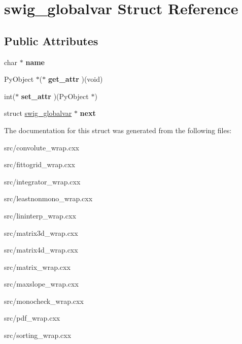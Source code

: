 \hypertarget{structswig__globalvar}{
\section{swig\_\-globalvar Struct Reference}
\label{d4/ddc/structswig__globalvar}
}
\subsection*{Public Attributes}
\begin{DoxyCompactItemize}
\item 
\hypertarget{structswig__globalvar_afbf8fc90fadf3be87612f68d2af889f7}{
char $\ast$ {\bfseries name}}
\label{d4/ddc/structswig__globalvar_afbf8fc90fadf3be87612f68d2af889f7}

\item 
\hypertarget{structswig__globalvar_a493a5974e1e2509ba48001f1a53d26ae}{
PyObject $\ast$($\ast$ {\bfseries get\_\-attr} )(void)}
\label{d4/ddc/structswig__globalvar_a493a5974e1e2509ba48001f1a53d26ae}

\item 
\hypertarget{structswig__globalvar_a494e3d5a5f1fb694b7738fdd1ffdd657}{
int($\ast$ {\bfseries set\_\-attr} )(PyObject $\ast$)}
\label{d4/ddc/structswig__globalvar_a494e3d5a5f1fb694b7738fdd1ffdd657}

\item 
\hypertarget{structswig__globalvar_a9b2b63ce956d35d5270e6460e3a1601e}{
struct \hyperlink{structswig__globalvar}{swig\_\-globalvar} $\ast$ {\bfseries next}}
\label{d4/ddc/structswig__globalvar_a9b2b63ce956d35d5270e6460e3a1601e}

\end{DoxyCompactItemize}


The documentation for this struct was generated from the following files:\begin{DoxyCompactItemize}
\item 
src/convolute\_\-wrap.cxx\item 
src/fittogrid\_\-wrap.cxx\item 
src/integrator\_\-wrap.cxx\item 
src/leastnonmono\_\-wrap.cxx\item 
src/lininterp\_\-wrap.cxx\item 
src/matrix3d\_\-wrap.cxx\item 
src/matrix4d\_\-wrap.cxx\item 
src/matrix\_\-wrap.cxx\item 
src/maxslope\_\-wrap.cxx\item 
src/monocheck\_\-wrap.cxx\item 
src/pdf\_\-wrap.cxx\item 
src/sorting\_\-wrap.cxx\end{DoxyCompactItemize}

